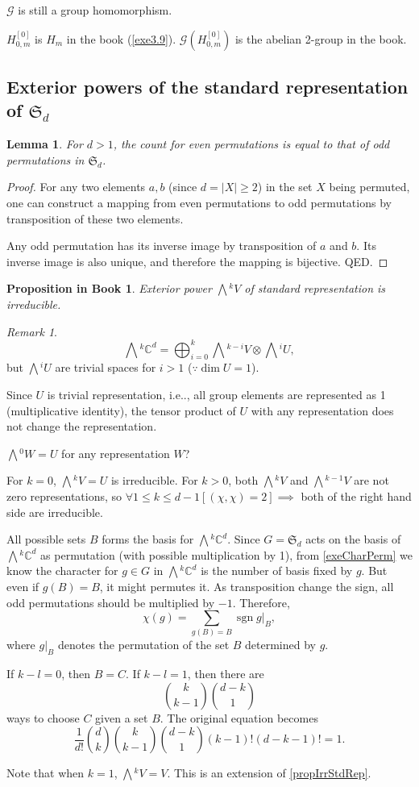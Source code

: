 \documentclass[12pt, letterpaper]{article}
\makeatletter
\newcommand{\co}{\mathbb{C}}
\newcommand{\sgn}{\operatorname{sgn}}
\newcommand{\ext}[1]{\bigwedge\!^{#1}}
\newcommand\ie{i.e\@ifnextchar.{}{.\@}}
\newcommand{\red}[1]{{\color{red} #1}}
\newcommand{\blue}[1]{{\color{blue} #1}}
\newcommand{\card}[1]{\left\lvert #1 \right\rvert}
\newtheorem{lem}[prop]{Lemma}
\theoremstyle{definition}
\theoremstyle{remark}
\newtheorem*{rem*}{Remark}
\theoremstyle{definition}
\theoremstyle{plain}
\newtheorem{pprop}[exe]{Proposition in Book}
\numberwithin{equation}{section}
\makeatother
\begin{document}
	$\mathcal{G}$ is still a group homomorphism.
	
	\blue{$H_{0,m}^{[0]}$ is $H_m$ in the book (\autoref{exe3.9}). $\mathcal{G}(H_{0,m}^{[0]})$ is the abelian 2-group in the book.}
	
	\subsection{Exterior powers of the standard representation of $\mathfrak{S}_d$}
	\begin{lem}
		For $d>1$, the count for even permutations is equal to that of odd permutations in $\mathfrak{S}_d$.
	\end{lem}
	\begin{proof}
		For any two elements $a, b$ (since $d=\card{X}\ge 2$) in the set $X$ being permuted,
		one can construct a mapping from even permutations to odd permutations
		by transposition of these two elements.

		Any odd permutation has its inverse image by transposition of $a$ and $b$.
		Its inverse image is also unique, and therefore the mapping is bijective. QED.
	\end{proof}
	\begin{pprop}
		Exterior power $\ext{k}V$ of standard representation is irreducible.
	\end{pprop}
	\begin{rem*}
		\[\ext{k}\co^d=\bigoplus_{i=0}^{k}\ext{k-i}V\otimes\ext{i}U,\]
		but $\ext{i}U$ are trivial spaces for $i>1$ ($\because\dim U = 1$).
		
		Since $U$ is trivial representation, \ie, all group elements are represented as 1 (multiplicative identity),
		the tensor product of $U$ with any representation does not change the representation.
		
		\red{$\ext{0}W=U$ for any representation $W$?}
		
		For $k=0$, $\ext{k}V=U$ is irreducible. For $k>0$, both $\ext{k}V$ and $\ext{k-1}V$ are not zero representations,
		so $\forall 1\le k\le d-1[(\chi,\chi)=2]\implies$ both of the right hand side are irreducible.
		
		All possible sets $B$ forms the basis for $\ext{k}\co^{d}$. Since $G=\mathfrak{S}_d$ acts on the basis of $\ext{k}\co^d$ as permutation (with possible multiplication by 1), from \autoref{exeCharPerm} we know the character for $g\in G$ in $\ext{k}\co^{d}$ is the number of basis fixed by $g$. But even if $g(B)=B$, it might permutes it. As transposition change the sign, all odd permutations should be multiplied by $-1$. Therefore,
		\[\chi(g)=\sum_{g(B)=B} \sgn g|_{B},\]
		where $g|_{B}$ denotes the permutation of the set $B$ determined by $g$.
		
		If $k-l=0$, then $B=C$. If $k-l=1$, then there are
		\[\binom{k}{k-1}\binom{d-k}{1} \]
		ways to choose $C$ given a set $B$. The original equation becomes
		\[\frac{1}{d!} \binom{d}{k} \binom{k}{k-1}\binom{d-k}{1}(k-1)!(d-k-1)!=1. \]
		
		Note that when $k=1$, $\ext{k}V=V$. This is an extension of \autoref{propIrrStdRep}.
	\end{rem*}
\end{document}
